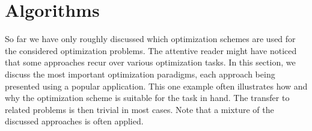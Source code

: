 \chapter{Algorithms}\label{chap:Algorithms}
So far we have only roughly discussed which optimization schemes are used for the considered optimization problems. The attentive reader might have noticed that some approaches recur over various optimization tasks. In this section, we discuss the most important optimization paradigms, each approach being presented using a popular application. This one example often illustrates how and why the optimization scheme is suitable for the task in hand. The transfer to related problems is then trivial in most cases. Note that a mixture of the discussed approaches is often applied.
